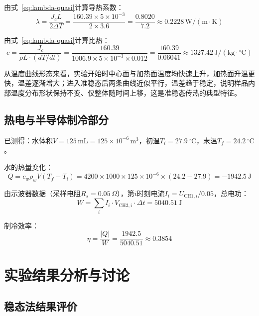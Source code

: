 \documentclass[UTF8]{article}
\begin{document}
由式~\eqref{eq:lambda-quasi}计算导热系数：
\begin{equation}
    \lambda = \frac{J_c L}{2\Delta T} = \frac{160.39\times 5\times10^{-3}}{2\times 3.6} = \frac{0.8020}{7.2} \approx 0.2228\,\mathrm{W/(m\cdot K)}
\end{equation}

由式~\eqref{eq:lambda-quasi}计算比热：
\begin{equation}
    c = \frac{J_c}{\rho L \cdot (dT/dt)} = \frac{160.39}{1006.9\times 5\times10^{-3}\times 0.012} = \frac{160.39}{0.06041} \approx 1327.42\,\mathrm{J/(kg\cdot{^{\circ}C})}
\end{equation}

从温度曲线形态来看，实验开始时中心面与加热面温度均快速上升，加热面升温更快，温差逐渐增大；进入准稳态后两条曲线近似平行，温差趋于稳定，说明样品内部温度分布形状保持不变、仅整体随时间上移，这是准稳态传热的典型特征。

\subsection{热电与半导体制冷部分}

已测得：水体积$V = 125\,\mathrm{mL} = 125\times10^{-6}\,\mathrm{m^3}$，初温$T_i = 27.9\,^{\circ}\mathrm{C}$，末温$T_f = 24.2\,^{\circ}\mathrm{C}$。

水的热量变化：
\begin{equation}
    Q = c_w\rho_w V(T_f - T_i) = 4200\times 1000\times 125\times10^{-6}\times(24.2-27.9) = -1942.5\,\mathrm{J}
\end{equation}

由示波器数据（采样电阻$R_s=0.05\,\Omega$），第$i$时刻电流$I_i = U_{\mathrm{CH1},i}/0.05$，总电功：
\begin{equation}
    W = \sum_i I_i \cdot V_{\mathrm{CH2},i}\cdot\Delta t = 5040.51\,\mathrm{J}
\end{equation}

制冷效率：
\begin{equation}
    \eta = \frac{|Q|}{W} = \frac{1942.5}{5040.51} \approx 0.3854
\end{equation}

\section{实验结果分析与讨论}

\subsection{稳态法结果评价}
\end{document}
